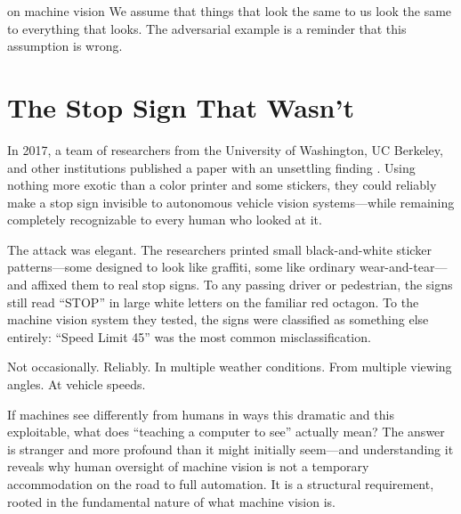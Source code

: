 
\label{chap:ch11}
\begin{chapterquote}{on machine vision}
We assume that things that look the same to us look the same to everything that looks. The adversarial example is a reminder that this assumption is wrong.
\end{chapterquote}

\section{The Stop Sign That Wasn't}
\label{sec:ch11-stopsign}

In 2017, a team of researchers from the University of Washington, UC Berkeley, and other institutions published a paper with an unsettling finding \autocite{eykholt2018robust}. Using nothing more exotic than a color printer and some stickers, they could reliably make a stop sign invisible to autonomous vehicle vision systems---while remaining completely recognizable to every human who looked at it.

The attack was elegant. The researchers printed small black-and-white sticker patterns---some designed to look like graffiti, some like ordinary wear-and-tear---and affixed them to real stop signs. To any passing driver or pedestrian, the signs still read ``STOP'' in large white letters on the familiar red octagon. To the machine vision system they tested, the signs were classified as something else entirely: ``Speed Limit 45'' was the most common misclassification.

Not occasionally. Reliably. In multiple weather conditions. From multiple viewing angles. At vehicle speeds.

\begin{cautionbox}
If machines see differently from humans in ways this dramatic and this exploitable, what does ``teaching a computer to see'' actually mean? The answer is stranger and more profound than it might initially seem---and understanding it reveals why human oversight of machine vision is not a temporary accommodation on the road to full automation. It is a structural requirement, rooted in the fundamental nature of what machine vision is.
\end{cautionbox}

